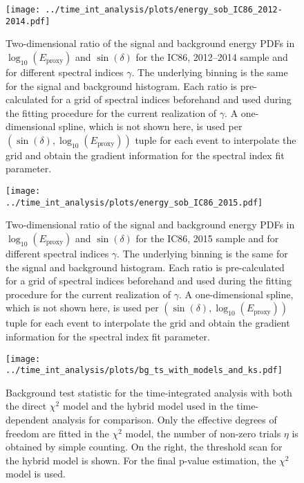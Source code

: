 \begin{figure}[H]
  \centering
  \texttt{[image: ../time\_int\_analysis/plots/energy\_sob\_IC86\_2012-2014.pdf]}
  \caption[Energy PDF for the time-integrated analysis for IC86, 2012--2014]{
    Two-dimensional ratio of the signal and background energy PDFs in $\log_{10}\left(E_\text{proxy}\right)$ and $\sin(\delta)$ for the IC86, 2012--2014 sample and for different spectral indices $\gamma$.
    The underlying binning is the same for the signal and background histogram.
    Each ratio is pre-calculated for a grid of spectral indices beforehand and used during the fitting procedure for the current realization of $\gamma$.
    A one-dimensional spline, which is not shown here, is used per $\left(\sin(\delta), \log_{10}\left(E_\text{proxy}\right)\right)$ tuple for each event to interpolate the grid and obtain the gradient information for the spectral index fit parameter.
  }
  \label{fig:tindep_energy_sob_IC86_2012-2014}
\end{figure}

\begin{figure}[H]
  \centering
  \texttt{[image: ../time\_int\_analysis/plots/energy\_sob\_IC86\_2015.pdf]}
  \caption[Energy PDF for the time-integrated analysis for IC86, 2015]{
    Two-dimensional ratio of the signal and background energy PDFs in $\log_{10}\left(E_\text{proxy}\right)$ and $\sin(\delta)$ for the IC86, 2015 sample and for different spectral indices $\gamma$.
    The underlying binning is the same for the signal and background histogram.
    Each ratio is pre-calculated for a grid of spectral indices beforehand and used during the fitting procedure for the current realization of $\gamma$.
    A one-dimensional spline, which is not shown here, is used per $\left(\sin(\delta), \log_{10}\left(E_\text{proxy}\right)\right)$ tuple for each event to interpolate the grid and obtain the gradient information for the spectral index fit parameter.
  }
  \label{fig:tindep_energy_sob_IC86_2015}
\end{figure}

\begin{figure}[H]
  \centering
  \texttt{[image: ../time\_int\_analysis/plots/bg\_ts\_with\_models\_and\_ks.pdf]}
  \caption[Background test statistic for the time-integrated analysis]{
    Background test statistic for the time-integrated analysis with both the direct $\chi^2$ model and the hybrid model used in the time-dependent analysis for comparison.
    Only the effective degrees of freedom are fitted in the $\chi^2$ model, the number of non-zero trials $\eta$ is obtained by simple counting.
    On the right, the threshold scan for the hybrid model is shown.
    For the final p-value estimation, the $\chi^2$ model is used.
  }
  \label{fig:bg_ts_with_models_and_ks}
\end{figure}


